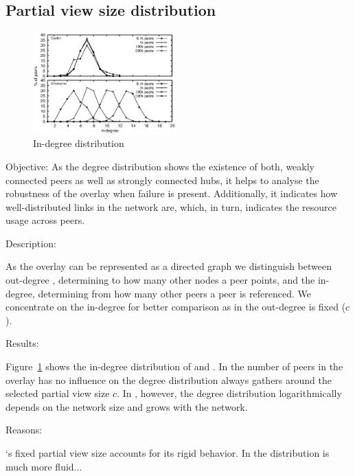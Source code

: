 \subsection{Partial view size distribution}
\begin{figure}
    \centering
    \includegraphics[width=0.49\textwidth]{img/histo.eps}
    \caption{In-degree distribution}
    \label{fig:histo}
\end{figure}
\begin{asparadesc}

\item[Objective:] 
    As the degree distribution shows the existence of both, weakly connected peers as well as strongly 
    connected hubs, it helps to analyse the robustness of the overlay when failure is present.
    Additionally, it indicates how well-distributed links in the network are, which, in turn,
    indicates the resource usage across peers.

\item[Description:] 

    As the overlay can be represented as a directed graph we distinguish between 
    out-degree , determining to how many other nodes a peer points, and the
    in-degree, determining from how many other peers a peer is referenced.
    We concentrate on the in-degree for better comparison as in \CYCLON{} the out-degree is fixed ($c$).

\item[Results:]

    Figure~\ref{fig:histo} shows the in-degree distribution of \CYCLON{} and \SCAMPLON{}.
    In \CYCLON{} the number of peers in the overlay has no influence on the degree distribution 
    always gathers around the selected partial view size $c$.
    In \SCAMPLON{}, however, the degree distribution logarithmically depends on the network size and grows
    with the network.

\item[Reasons:]

    \CYCLON{}`s fixed partial view size accounts for its rigid behavior.
    In \SCAMPLON{} the distribution is much more fluid...

\end{asparadesc}

